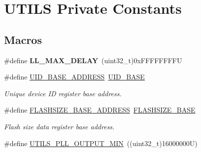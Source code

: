 \hypertarget{group___u_t_i_l_s___l_l___private___constants}{}\section{U\+T\+I\+LS Private Constants}
\label{group___u_t_i_l_s___l_l___private___constants}
\subsection*{Macros}
\begin{DoxyCompactItemize}
\item 
\mbox{\label{group___u_t_i_l_s___l_l___private___constants_ga29a1b776c24b7c32f30fcd6851ddd028}} 
\#define {\bfseries L\+L\+\_\+\+M\+A\+X\+\_\+\+D\+E\+L\+AY}~(uint32\+\_\+t)0x\+F\+F\+F\+F\+F\+F\+F\+FU
\item 
\mbox{\label{group___u_t_i_l_s___l_l___private___constants_ga732ec8206df1d365f1c23eee46d681dd}} 
\#define \hyperlink{group___u_t_i_l_s___l_l___private___constants_ga732ec8206df1d365f1c23eee46d681dd}{U\+I\+D\+\_\+\+B\+A\+S\+E\+\_\+\+A\+D\+D\+R\+E\+SS}~\hyperlink{group___peripheral__memory__map_ga664eda42b83c919b153b07b23348be67}{U\+I\+D\+\_\+\+B\+A\+SE}
\begin{DoxyCompactList}\small\item\em Unique device ID register base address. \end{DoxyCompactList}\item 
\mbox{\label{group___u_t_i_l_s___l_l___private___constants_ga75b8f6b080a5dfaaf829edeae69bff70}} 
\#define \hyperlink{group___u_t_i_l_s___l_l___private___constants_ga75b8f6b080a5dfaaf829edeae69bff70}{F\+L\+A\+S\+H\+S\+I\+Z\+E\+\_\+\+B\+A\+S\+E\+\_\+\+A\+D\+D\+R\+E\+SS}~\hyperlink{group___peripheral__memory__map_ga776d985f2d4d40b588ef6ca9d573af78}{F\+L\+A\+S\+H\+S\+I\+Z\+E\+\_\+\+B\+A\+SE}
\begin{DoxyCompactList}\small\item\em Flash size data register base address. \end{DoxyCompactList}\item 
\#define \hyperlink{group___u_t_i_l_s___l_l___private___constants_gad04670e4dd1d91d02b6ac32498d74d81}{U\+T\+I\+L\+S\+\_\+\+P\+L\+L\+\_\+\+O\+U\+T\+P\+U\+T\+\_\+\+M\+IN}~((uint32\+\_\+t)16000000\+U)

\end{DoxyCompactItemize}
